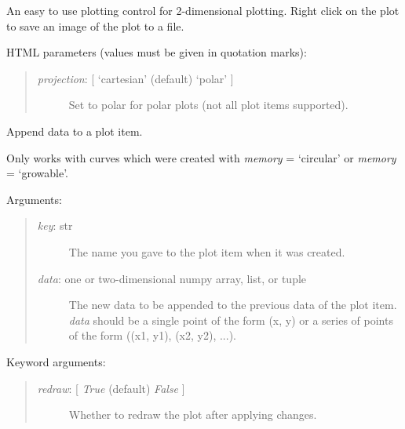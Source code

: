 \documentclass[letterpaper,10pt,english]{sphinxmanual}
\begin{document}

\begin{fulllineitems}
\label{api:controls.Plot2D}
An easy to use plotting control for 2-dimensional plotting.
Right click on the plot to save an image of the plot to a file.

HTML parameters (values must be given in quotation marks):
\begin{quote}
\begin{description}
\item[{\emph{projection}: {[} `cartesian' (default) \textbar{} `polar' {]}}] \leavevmode
Set to polar for polar plots (not all plot items supported).

\end{description}
\end{quote}

\begin{fulllineitems}
\label{api:controls.Plot2D.append_data}
Append data to a plot item.

Only works with curves which were created with 
\emph{memory} = `circular' or \emph{memory} = `growable'.

Arguments:
\begin{quote}
\begin{description}
\item[{\emph{key}: str}] \leavevmode
The name you gave to the plot item when it was created.

\item[{\emph{data}: one or two-dimensional numpy array, list, or tuple}] \leavevmode
The new data to be appended to the previous data of the plot item.
\emph{data} should be a single point of the form (x, y) or a series of
points of the form ((x1, y1), (x2, y2), ...).

\end{description}
\end{quote}

Keyword arguments:
\begin{quote}
\begin{description}
\item[{\emph{redraw}: {[} \emph{True}  (default) \textbar{} \emph{False} {]}}] \leavevmode
Whether to redraw the plot after applying changes.


\end{description}
\end{quote}
\end{fulllineitems}
\end{fulllineitems}
\end{document}
